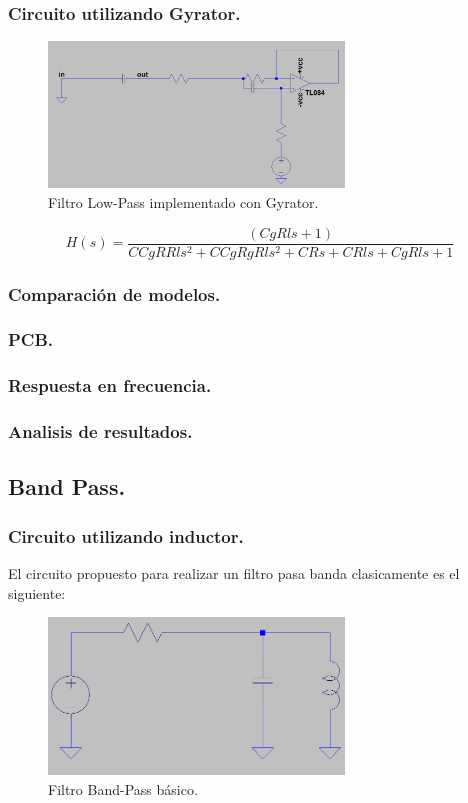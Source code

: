\documentclass[a4paper]{article}
\begin{document}
\subsubsection{Circuito utilizando Gyrator.}
\begin{figure}[H]	
	\centering
	\includegraphics[width=0.7\textwidth]{gyrLP.PNG}
	\caption{Filtro Low-Pass implementado con Gyrator.}
	\label{fig:gyrLP}
\end{figure}
\begin{equation} H(s)= \frac{\left(Cg Rl s + 1\right)}{C Cg R Rl s^{2} + C Cg Rg Rl s^{2} + C R s + C Rl s + Cg Rl s + 1} \end{equation}
\subsubsection{Comparación de modelos.}
\subsubsection{PCB.}
\subsubsection{Respuesta en frecuencia.}
\subsubsection{Analisis de resultados.}
\newpage
\subsection{Band Pass.}
\subsubsection{Circuito utilizando inductor.}
El circuito propuesto para realizar un filtro pasa banda clasicamente es el siguiente:
\begin{figure}[H]	
	\centering
	\includegraphics[width=0.7\textwidth]{basicBP.PNG}
	\caption{Filtro Band-Pass básico.}
	\label{fig:basBP}
\end{figure}
\end{document}
